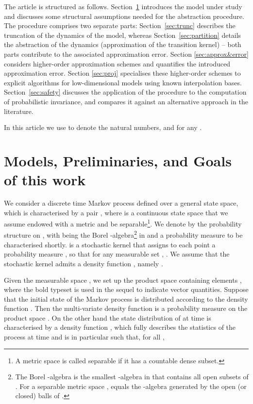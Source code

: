 \documentclass{LMCS}
\begin{document}
The article is structured as follows. 
Section~\ref{sec:prelim} introduces the model under study and discusses some structural assumptions needed for the abstraction procedure. 
The procedure comprises two separate parts:
Section~\ref{sec:trunc} describes the truncation of the dynamics of the model, 
whereas Section~\ref{sec:partition} details the abstraction of the dynamics (approximation of the transition kernel) -- 
both parts contribute to the associated approximation error. 
Section \ref{sec:approx&error} considers higher-order approximation schemes and quantifies
the introduced approximation error. Section \ref{sec:proj} specialises 
these higher-order schemes to explicit algorithms for low-dimensional models using known interpolation bases. 
Section~\ref{sec:safety} discusses the application of the procedure to the computation of probabilistic invariance, 
and compares it against an alternative approach in the literature.

\smallskip

In this article we use  to denote the natural numbers,
 and 
for any .

\section{Models, Preliminaries, and Goals of this work}
\label{sec:prelim}

We consider a discrete time Markov process  defined over a general state space, 
which is characterised by a pair ,
where  is a continuous state space that we assume endowed with a metric and be separable\footnote{A metric space  is called separable if it has a countable dense subset.}.
We denote by  the probability structure on ,
with  being the Borel -algebra\footnote{The Borel -algebra  is the smallest -algebra in  that contains all open subsets of . For a separable metric space ,  equals the -algebra generated by the open (or closed) balls of .} 
in  and  a probability measure to be characterised shortly.  
 is a stochastic kernel that assigns to each point  a probability measure , 
so that for any measurable set , 
. 
We assume that the stochastic kernel  admits a density function ,
namely .  

Given the measurable space , we set up the product space 
containing elements , where the bold typeset is used in the sequel to indicate vector quantities.
Suppose that the initial state of the Markov process  is distributed according to the density function . Then the multi-variate density function 
is a probability measure  on the product space .
On the other hand the state distribution of  at time  is characterised by a density function ,
which fully describes the statistics of the process at time  and is in particular such that, 
for all , 
\end{document}
